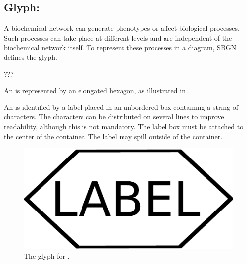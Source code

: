 \subsection{Glyph: }
\label{sec:af:phenotype}

A biochemical network can generate phenotypes or affect biological processes. Such processes can take place at different levels and are independent of the biochemical network itself. To represent these processes in a diagram, SBGN defines the  glyph.

\begin{glyphDescription}

\glyphSboTerm ???

\glyphContainer An  is represented by an elongated
hexagon, as illustrated in .

\glyphLabel An  is identified by a label placed in an
unbordered box containing a string of characters.  The characters can be
distributed on several lines to improve readability, although this is not
mandatory.  The label box must be attached to the center of the
 container.  The label may spill outside of the container.

\end{glyphDescription}

\begin{figure}[H]
  \centering
  \includegraphics[scale = 0.4]{images/phenotype}
  \caption{The \AF glyph for .}
  \label{fig:af:phenotype}
\end{figure}
